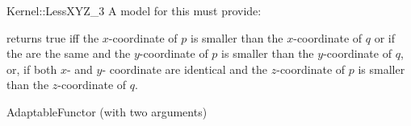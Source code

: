 \begin{ccRefFunctionObjectConcept}{Kernel::LessXYZ_3}
A model for this must provide:


{returns true iff the $x$-coordinate of $p$ is smaller than the
$x$-coordinate of $q$ or if the are the same and 
the $y$-coordinate of $p$ is smaller than the $y$-coordinate of $q$, or,
if both $x$- and $y$- coordinate are identical and
the $z$-coordinate of $p$ is smaller than the $z$-coordinate of $q$.}

\ccRefines
AdaptableFunctor (with two arguments)

\ccSeeAlso
{}\\

\end{ccRefFunctionObjectConcept}
